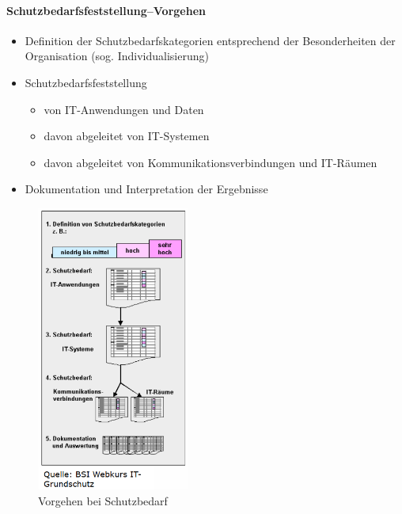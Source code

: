 \documentclass[10pt,a4paper]{article}
\begin{document}
\paragraph*{Schutzbedarfsfeststellung–Vorgehen}

\begin{itemize}[noitemsep,topsep=0pt,leftmargin=*]
    \item Definition der Schutzbedarfskategorien
    entsprechend der Besonderheiten der
    Organisation (sog. Individualisierung)
    \item Schutzbedarfsfeststellung
    \begin{itemize}[noitemsep,topsep=0pt,leftmargin=*]
        \item von IT-Anwendungen und Daten
        \item davon abgeleitet von IT-Systemen
        \item davon abgeleitet von
        Kommunikationsverbindungen und
        IT-Räumen
    \end{itemize}
    \item Dokumentation und Interpretation der Ergebnisse
\end{itemize}

\begin{figure}[H]
    \begin{center}
    \includegraphics[width=5cm]{images/Schutzbedarf_vorgehen.png}
    \caption{Vorgehen bei Schutzbedarf}
    \label{schutzbedarfvorgehen}
    \end{center}
\end{figure}
\end{document}
